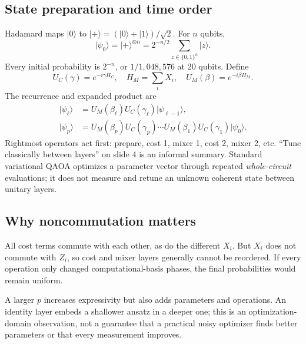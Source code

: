 \documentclass[11pt,letterpaper]{article}
\newcommand{\ket}[1]{\lvert #1\rangle}
\begin{document}
\subsection{State preparation and time order}
Hadamard maps $\ket0$ to $\ket+=(\ket0+\ket1)/\sqrt2$. For $n$ qubits,
\begin{equation}
 \ket{\psi_0}=\ket+^{\otimes n}=2^{-n/2}\sum_{z\in\{0,1\}^n}\ket z.
\end{equation}
Every initial probability is $2^{-n}$, or $1/1{,}048{,}576$ at 20 qubits. Define
\begin{equation}
 U_C(\gamma)=e^{-i\gamma H_C},\quad H_M=\sum_iX_i,\quad
 U_M(\beta)=e^{-i\beta H_M}.
\end{equation}
The recurrence and expanded product are
\begin{align}
 \ket{\psi_\ell}&=U_M(\beta_\ell)U_C(\gamma_\ell)\ket{\psi_{\ell-1}},\\
 \ket{\psi_p}&=U_M(\beta_p)U_C(\gamma_p)\cdots
 U_M(\beta_1)U_C(\gamma_1)\ket{\psi_0}.\label{eq:qaoa}
\end{align}
Rightmost operators act first: prepare, cost 1, mixer 1, cost 2, mixer 2, etc. ``Tune classically between layers'' on slide 4 is an informal summary. Standard variational QAOA optimizes a parameter vector through repeated \emph{whole-circuit} evaluations; it does not measure and retune an unknown coherent state between unitary layers.

\subsection{Why noncommutation matters}
All cost terms commute with each other, as do the different $X_i$. But $X_i$ does not commute with $Z_i$, so cost and mixer layers generally cannot be reordered. If every operation only changed computational-basis phases, the final probabilities would remain uniform.

A larger $p$ increases expressivity but also adds parameters and operations. An identity layer embeds a shallower ansatz in a deeper one; this is an optimization-domain observation, not a guarantee that a practical noisy optimizer finds better parameters or that every measurement improves.
\end{document}
